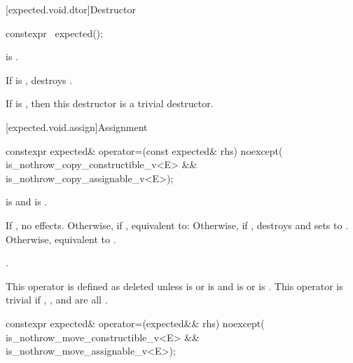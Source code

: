 [expected.void.dtor]{Destructor}

%
\begin{itemdecl}
constexpr ~expected();
\end{itemdecl}

\begin{itemdescr}
\pnum
\constraints
{} is .

\pnum
\effects
If  is , destroys .

\pnum
\remarks
If  is , then this destructor is a trivial destructor.
\end{itemdescr}

[expected.void.assign]{Assignment}

%
\begin{itemdecl}
constexpr expected& operator=(const expected& rhs) noexcept(
    is_nothrow_copy_constructible_v<E> && is_nothrow_copy_assignable_v<E>);
\end{itemdecl}

\begin{itemdescr}
\pnum
\constraints
{} is  and  is .

\pnum
\effects
If , no effects. Otherwise, if , equivalent to:  Otherwise, if , destroys  and sets  to . Otherwise, equivalent to .

\pnum
\returns
{}.

\pnum
\remarks
This operator is defined as deleted unless  is  or  is  and  is  or  is . This operator is trivial if , , and  are all .
\end{itemdescr}

%
\begin{itemdecl}
constexpr expected& operator=(expected&& rhs) noexcept(
    is_nothrow_move_constructible_v<E> && is_nothrow_move_assignable_v<E>);
\end{itemdecl}

